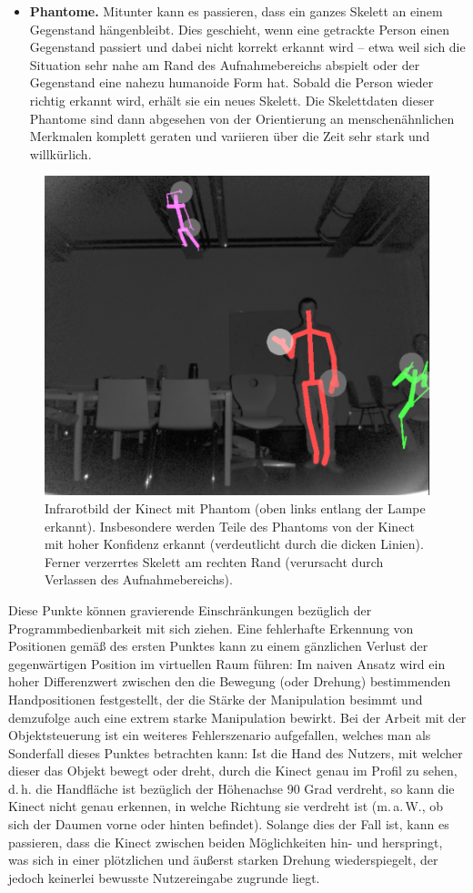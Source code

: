 \begin{itemize}
		\item \textbf{Phantome.} Mitunter kann es passieren, dass ein ganzes Skelett an einem Gegenstand hängenbleibt. Dies geschieht, wenn eine getrackte Person einen Gegenstand passiert und dabei nicht korrekt erkannt wird -- etwa weil sich die Situation sehr nahe am Rand des Aufnahmebereichs abspielt oder der Gegenstand eine nahezu humanoide Form hat. Sobald die Person wieder richtig erkannt wird, erhält sie ein neues Skelett. Die Skelettdaten dieser Phantome sind dann abgesehen von der Orientierung an menschenähnlichen Merkmalen komplett geraten und variieren über die Zeit sehr stark und willkürlich.
	\end{itemize}
	\begin{figure}
	\centering
	\includegraphics[width=.7\textwidth]{pictures/ninja.png}
	\caption{Infrarotbild der Kinect mit Phantom (oben links entlang der Lampe erkannt). Insbesondere werden Teile des Phantoms von der Kinect mit hoher Konfidenz erkannt (verdeutlicht durch die dicken Linien).\\
	Ferner verzerrtes Skelett am rechten Rand (verursacht durch Verlassen des Aufnahmebereichs).}
	\end{figure}
	Diese Punkte können gravierende Einschränkungen bezüglich der Programmbedienbarkeit mit sich ziehen. Eine fehlerhafte Erkennung von Positionen gemäß des ersten Punktes kann zu einem gänzlichen Verlust der gegenwärtigen Position im virtuellen Raum führen: Im naiven Ansatz wird ein hoher Differenzwert zwischen den die Bewegung (oder Drehung) bestimmenden Handpositionen festgestellt, der die Stärke der Manipulation besimmt und demzufolge auch eine extrem starke Manipulation bewirkt. Bei der Arbeit mit der Objektsteuerung ist ein weiteres Fehlerszenario aufgefallen, welches man als Sonderfall dieses Punktes betrachten kann: Ist die Hand des Nutzers, mit welcher dieser das Objekt bewegt oder dreht, durch die Kinect genau im Profil zu sehen, d.\,h. die Handfläche ist bezüglich der Höhenachse 90 Grad verdreht, so kann die Kinect nicht genau erkennen, in welche Richtung sie verdreht ist (m.\,a.\,W., ob sich der Daumen vorne oder hinten befindet). Solange dies der Fall ist, kann es passieren, dass die Kinect zwischen beiden Möglichkeiten hin- und herspringt, was sich in einer plötzlichen und äußerst starken Drehung wiederspiegelt, der jedoch keinerlei bewusste Nutzereingabe zugrunde liegt.\par 
